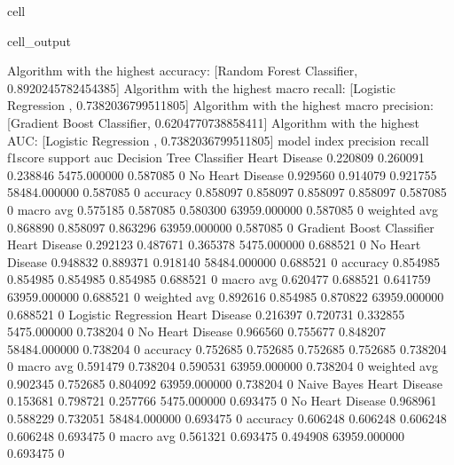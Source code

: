 \documentclass[letterpaper,10pt,english]{jupyterBook}
\begin{document}
\begin{sphinxuseclass}{cell}
\begin{sphinxVerbatimOutput}
\begin{sphinxuseclass}{cell_output}
\begin{sphinxVerbatim}[commandchars=\\\{\}]
Algorithm with the highest accuracy: [\PYGZsq{}Random Forest Classifier\PYGZsq{}, 0.8920245782454385]
Algorithm with the highest macro recall:
        [\PYGZsq{}Logistic Regression \PYGZsq{}, 0.7382036799511805]
Algorithm with the highest macro precision:
        [\PYGZsq{}Gradient Boost Classifier\PYGZsq{}, 0.6204770738858411]
Algorithm with the highest AUC:
        [\PYGZsq{}Logistic Regression \PYGZsq{}, 0.7382036799511805]
model                      index             precision  recall    f1\PYGZhy{}score  support       auc     
Decision Tree Classifier   Heart Disease     0.220809   0.260091  0.238846  5475.000000   0.587085    0
                           No Heart Disease  0.929560   0.914079  0.921755  58484.000000  0.587085    0
                           accuracy          0.858097   0.858097  0.858097  0.858097      0.587085    0
                           macro avg         0.575185   0.587085  0.580300  63959.000000  0.587085    0
                           weighted avg      0.868890   0.858097  0.863296  63959.000000  0.587085    0
Gradient Boost Classifier  Heart Disease     0.292123   0.487671  0.365378  5475.000000   0.688521    0
                           No Heart Disease  0.948832   0.889371  0.918140  58484.000000  0.688521    0
                           accuracy          0.854985   0.854985  0.854985  0.854985      0.688521    0
                           macro avg         0.620477   0.688521  0.641759  63959.000000  0.688521    0
                           weighted avg      0.892616   0.854985  0.870822  63959.000000  0.688521    0
Logistic Regression        Heart Disease     0.216397   0.720731  0.332855  5475.000000   0.738204    0
                           No Heart Disease  0.966560   0.755677  0.848207  58484.000000  0.738204    0
                           accuracy          0.752685   0.752685  0.752685  0.752685      0.738204    0
                           macro avg         0.591479   0.738204  0.590531  63959.000000  0.738204    0
                           weighted avg      0.902345   0.752685  0.804092  63959.000000  0.738204    0
Naive Bayes                Heart Disease     0.153681   0.798721  0.257766  5475.000000   0.693475    0
                           No Heart Disease  0.968961   0.588229  0.732051  58484.000000  0.693475    0
                           accuracy          0.606248   0.606248  0.606248  0.606248      0.693475    0
                           macro avg         0.561321   0.693475  0.494908  63959.000000  0.693475    0

\end{sphinxVerbatim}
\end{sphinxuseclass}
\end{sphinxVerbatimOutput}
\end{sphinxuseclass}
\end{document}
